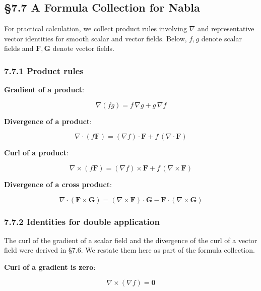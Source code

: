 \documentclass[a4paper,12pt,openany]{book}
\begin{document}
\par\vspace{0.35em}\par

\hypertarget{a-formula-collection-for-nabla}{%
\subsection{§7.7 A Formula Collection for
Nabla}\label{a-formula-collection-for-nabla}}

For practical calculation, we collect product rules involving \(\nabla\)
and representative vector identities for smooth scalar and vector
fields. Below, \(f, g\) denote scalar fields and
\(\mathbf{F}, \mathbf{G}\) denote vector fields.

\hypertarget{product-rules}{%
\subsubsection{7.7.1 Product rules}\label{product-rules}}

\textbf{Gradient of a product}:

\[\nabla(fg) = f\,\nabla g + g\,\nabla f\]

\textbf{Divergence of a product}:

\[\nabla \cdot (f\mathbf{F}) = (\nabla f) \cdot \mathbf{F} + f\,(\nabla \cdot \mathbf{F})\]

\textbf{Curl of a product}:

\[\nabla \times (f\mathbf{F}) = (\nabla f) \times \mathbf{F} + f\,(\nabla \times \mathbf{F})\]

\textbf{Divergence of a cross product}:

\[\nabla \cdot (\mathbf{F} \times \mathbf{G}) = (\nabla \times \mathbf{F}) \cdot \mathbf{G} - \mathbf{F} \cdot (\nabla \times \mathbf{G})\]

\hypertarget{identities-for-double-application}{%
\subsubsection{7.7.2 Identities for double
application}\label{identities-for-double-application}}

The curl of the gradient of a scalar field and the divergence of the
curl of a vector field were derived in §7.6. We restate them here as
part of the formula collection.

\textbf{Curl of a gradient is zero}:

\[\nabla \times (\nabla f) = \mathbf{0}\]
\end{document}
